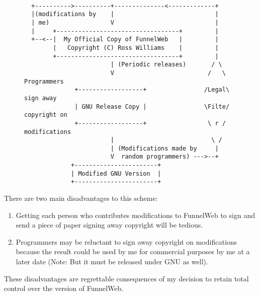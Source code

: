 \begin{figure}[htbp]
\begin{verbatim}

  +---------->----------+--------------<-------------+
  |(modifications by    |                            |
  | me)                 V                            |
  |     +----------------------------------+         |
  +--<--|  My Official Copy of FunnelWeb   |         |
        |   Copyright (C) Ross Williams    |         |
        +----------------------------------+         |
                        | (Periodic releases)       / \
                        V                          /   \  Programmers
              +------------------+                /Legal\ sign away
              | GNU Release Copy |                \Filte/ copyright on
              +------------------+                 \ r /  modifications
                        |                           \ /
                        | (Modifications made by     |
                        V  random programmers) --->--+
             +-----------------------+
             | Modified GNU Version  |
             +-----------------------+

\end{verbatim}
\end{figure}

There are two main disadvantages to this scheme:

\begin{enumerate}

\item Getting each person who contributes modifications to FunnelWeb
to sign and send a piece of paper signing away copyright will be tedious.

\item Programmers may be reluctant to sign away copyright on modifications
because the result could be used by me for commercial purposes
by me at a later date (Note: But it must be released under GNU as well).

\end{enumerate}

These disadvantages are regrettable consequences of my decision to retain
total control over the \dq{official} version of FunnelWeb.

